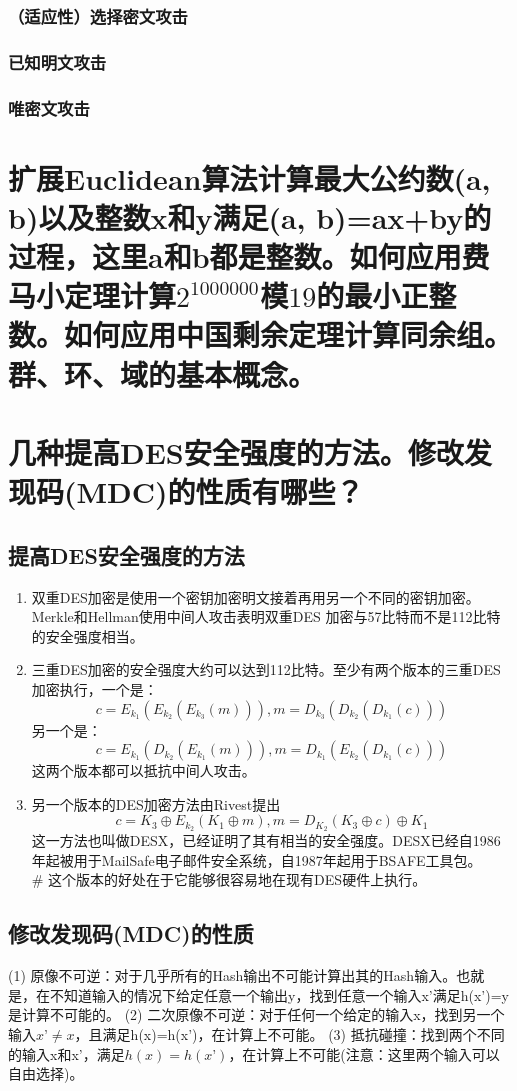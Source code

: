 \documentclass[11pt,a4paper]{article}
\begin{document}
\subsubsection{（适应性）选择密文攻击}
\subsubsection{已知明文攻击}
\subsubsection{唯密文攻击}

\section{扩展Euclidean算法计算最大公约数(a, b)以及整数x和y满足(a, b)=ax+by的过程，这里a和b都是整数。如何应用费马小定理计算$2^{1000000}$模$19$的最小正整数。如何应用中国剩余定理计算同余组。群、环、域的基本概念。}

\section{几种提高DES安全强度的方法。修改发现码(MDC)的性质有哪些？}
\subsection{提高DES安全强度的方法}
\begin{enumerate}[1)]
\item 双重DES加密是使用一个密钥加密明文接着再用另一个不同的密钥加密。Merkle和Hellman使用中间人攻击表明双重DES 加密与57比特而不是112比特的安全强度相当。
\item 三重DES加密的安全强度大约可以达到112比特。至少有两个版本的三重DES加密执行，一个是：
$$ c = E_{k_1}(E_{k_2}(E_{k_3}(m))), m=D_{k_3}(D_{k_2}(D_{k_1}(c)))$$
另一个是：
$$ c = E_{k_1}(D_{k_2}(E_{k_1}(m))), m=D_{k_1}(E_{k_2}(D_{k_1}(c))) $$
这两个版本都可以抵抗中间人攻击。
\item 另一个版本的DES加密方法由Rivest提出
$$ c=K_3 \oplus E_{k_2}(K_1\oplus m), m=D_{K_2}(K_3 \oplus c) \oplus K_1$$
这一方法也叫做DESX，已经证明了其有相当的安全强度。DESX已经自1986年起被用于MailSafe电子邮件安全系统，自1987年起用于BSAFE工具包。\\
\# 这个版本的好处在于它能够很容易地在现有DES硬件上执行。
\end{enumerate}
\subsection{修改发现码(MDC)的性质}
(1) 原像不可逆：对于几乎所有的Hash输出不可能计算出其的Hash输入。也就是，在不知道输入的情况下给定任意一个输出y，找到任意一个输入x’满足h(x’)=y 是计算不可能的。
(2) 二次原像不可逆：对于任何一个给定的输入x，找到另一个输入$x’\ne x$，且满足h(x)=h(x’)，在计算上不可能。
(3) 抵抗碰撞：找到两个不同的输入x和x’，满足$h(x)=h(x’)$，在计算上不可能(注意：这里两个输入可以自由选择)。
\end{document}
